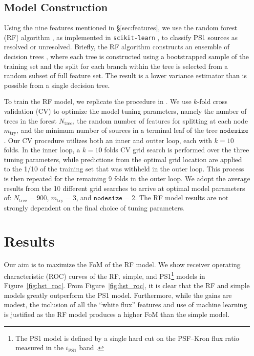 \documentclass[twocolumn]{aastex63}
\begin{document}
\subsection{Model Construction}

Using the nine features mentioned in \S\ref{sec:features}, we use the random
forest (RF) algorithm \citep{Breiman01}, as implemented in
\texttt{scikit-learn} \citep{Pedregosa11}, to classify PS1 sources as resolved
or unresolved. Briefly, the RF algorithm constructs an ensemble of decision
trees \citep{Breiman84}, where each tree is constructed using a bootstrapped
sample of the training set \citep[a method known as ``bagging'';][]{Breiman96}
and the split for each branch within the tree is selected from a random subset
of full feature set. The result is a lower variance estimator than is possible
from a single decision tree.

To train the RF model, we replicate the procedure in \citet{Tachibana18}. We
use $k$-fold cross validation (CV) to optimize the model tuning parameters,
namely the number of trees in the forest $N_\mathrm{tree}$, the random number
of features for splitting at each node $m_\mathrm{try}$, and the minimum
number of sources in a terminal leaf of the tree $\mathtt{nodesize}$. Our CV
procedure utilizes both an inner and outter loop, each with $k = 10$ folds. In
the inner loop, a $k = 10$ folds CV grid search is performed over the three
tuning parameters, while predictions from the optimal grid location are
applied to the 1/10 of the training set that was withheld in the outer loop.
This process is then repeated for the remaining 9 folds in the outer loop. We
adopt the average results from the 10 different grid searches to arrive at
optimal model parameters of: $N_\mathrm{tree} = 900$, $m_\mathrm{try}
= 3$, and $\mathtt{nodesize} = 2$. The RF model results are not strongly
dependent on the final choice of tuning parameters.

\section{Results}

Our aim is to maximize the FoM of the RF model. We show receiver operating
characteristic (ROC) curves of the RF, simple, and PS1\footnote{The PS1 model
is defined by a single hard cut on the PSF--Kron flux ratio measured in the
$i_\mathrm{PS1}$ band \citep[for further details see][]{Tachibana18}.} models
in Figure~\ref{fig:hst_roc}. From Figure~\ref{fig:hst_roc}, it is clear that
the RF and simple models greatly outperform the PS1 model. Furthermore, while
the gains are modest, the inclusion of all the ``white flux'' features and use
of machine learning is justified as the RF model produces a higher FoM than
the simple model.
\end{document}
